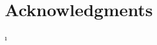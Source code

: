 \documentclass[10pt,letterpaper]{article}
\begin{document}
 

\section{Acknowledgments}





\setlength{\bibleftmargin}{.125in}
\setlength{\bibindent}{-\bibleftmargin}ı
\end{document}
